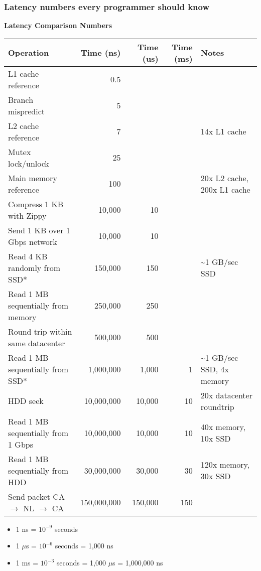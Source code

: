 \subsubsection{Latency numbers every programmer should know}
\begin{summary}
    \begin{center}
        \textbf{Latency Comparison Numbers}
        \begin{tabular}{l r r r l}
        \toprule
        \textbf{Operation} & \textbf{Time (ns)} & \textbf{Time (us)} & \textbf{Time (ms)} & \textbf{Notes} \\
        \midrule
        L1 cache reference & 0.5 & & & \\
        Branch mispredict & 5 & & & \\
        L2 cache reference & 7 & & & 14x L1 cache \\
        Mutex lock/unlock & 25 & & & \\
        Main memory reference & 100 & & & 20x L2 cache, 200x L1 cache \\
        Compress 1 KB with Zippy & 10,000 & 10 & & \\
        Send 1 KB over 1 Gbps network & 10,000 & 10 & & \\
        Read 4 KB randomly from SSD* & 150,000 & 150 & & \textasciitilde1 GB/sec SSD \\
        Read 1 MB sequentially from memory & 250,000 & 250 & & \\
        Round trip within same datacenter & 500,000 & 500 & & \\
        Read 1 MB sequentially from SSD* & 1,000,000 & 1,000 & 1 & \textasciitilde1 GB/sec SSD, 4x memory \\
        HDD seek & 10,000,000 & 10,000 & 10 & 20x datacenter roundtrip \\
        Read 1 MB sequentially from 1 Gbps & 10,000,000 & 10,000 & 10 & 40x memory, 10x SSD \\
        Read 1 MB sequentially from HDD & 30,000,000 & 30,000 & 30 & 120x memory, 30x SSD \\
        Send packet CA $\rightarrow$ NL $\rightarrow$ CA & 150,000,000 & 150,000 & 150 & \\
        \bottomrule
        \end{tabular}
    \end{center}
    \vspace{1em}

    \begin{itemize}
        \item 1 ns = $10^{-9}$ seconds
        \item 1 $\mu$s = $10^{-6}$ seconds = 1,000 ns
        \item 1 ms = $10^{-3}$ seconds = 1,000 $\mu$s = 1,000,000 ns
    \end{itemize}
    \vspace{1em}


\end{summary}

